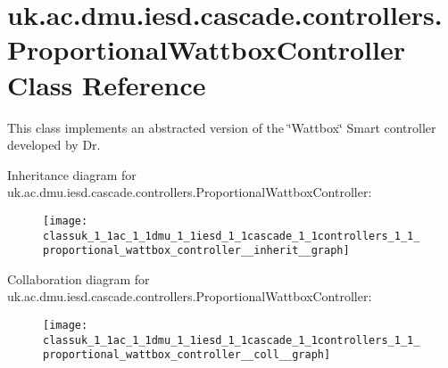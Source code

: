 \hypertarget{classuk_1_1ac_1_1dmu_1_1iesd_1_1cascade_1_1controllers_1_1_proportional_wattbox_controller}{\section{uk.\-ac.\-dmu.\-iesd.\-cascade.\-controllers.\-Proportional\-Wattbox\-Controller Class Reference}
\label{classuk_1_1ac_1_1dmu_1_1iesd_1_1cascade_1_1controllers_1_1_proportional_wattbox_controller}
}


This class implements an abstracted version of the \char`\"{}\-Wattbox\char`\"{} Smart controller developed by Dr.  




Inheritance diagram for uk.\-ac.\-dmu.\-iesd.\-cascade.\-controllers.\-Proportional\-Wattbox\-Controller\-:\nopagebreak
\begin{figure}[H]
\begin{center}
\leavevmode
\texttt{[image: classuk\_1\_1ac\_1\_1dmu\_1\_1iesd\_1\_1cascade\_1\_1controllers\_1\_1\_proportional\_wattbox\_controller\_\_inherit\_\_graph]}
\end{center}
\end{figure}


Collaboration diagram for uk.\-ac.\-dmu.\-iesd.\-cascade.\-controllers.\-Proportional\-Wattbox\-Controller\-:\nopagebreak
\begin{figure}[H]
\begin{center}
\leavevmode
\texttt{[image: classuk\_1\_1ac\_1\_1dmu\_1\_1iesd\_1\_1cascade\_1\_1controllers\_1\_1\_proportional\_wattbox\_controller\_\_coll\_\_graph]}
\end{center}
\end{figure}
